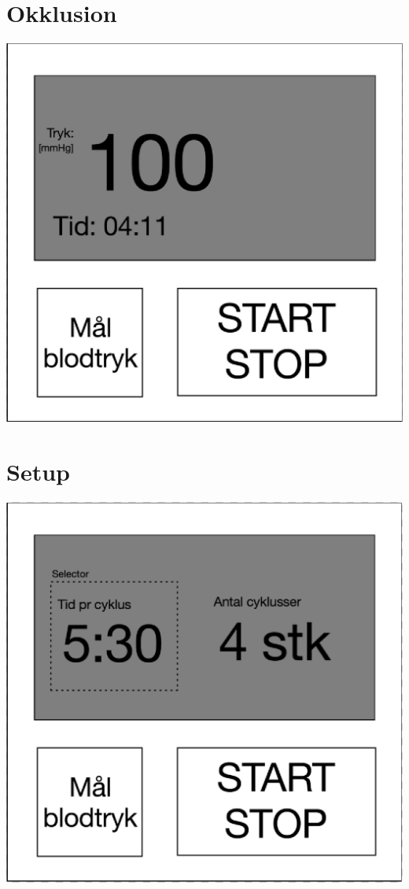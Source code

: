 \section{Okklusion}
\includegraphics[width=\textwidth]{Illustrationer/OkklusionGUI}

\section{Setup}
\includegraphics[width=\textwidth]{Illustrationer/SetupGUI}

